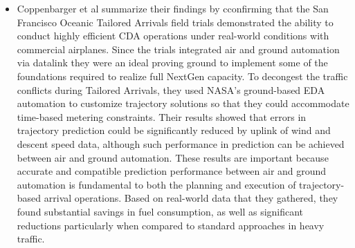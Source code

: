 \documentclass{aer1315-pretty}
\begin{document}
\begin{itemize}
\item Coppenbarger et al \cite{Copp:2007} summarize their findings by  cconfirming that the San Francisco Oceanic Tailored Arrivals field trials demonstrated the ability to conduct highly efficient CDA operations under real-world conditions with commercial airplanes. Since the trials integrated air and ground automation via datalink they were an ideal proving ground to implement some of the foundations required to realize full NextGen capacity. To decongest the traffic conflicts during Tailored Arrivals, they used NASA’s ground-based EDA automation to customize trajectory solutions so that they could accommodate time-based metering constraints. 
Their results showed that errors in trajectory prediction could be significantly reduced by uplink of wind and descent speed data, although such performance in prediction can be achieved between air and ground automation. 
These results are important because accurate and compatible prediction performance between air and ground automation is fundamental to both the planning and execution of trajectory-based arrival operations. 
Based on real-world data that they gathered, they found substantial savings in fuel consumption, as well as significant reductions particularly when compared to standard approaches in heavy traffic. 



\end{itemize}
\end{document}
